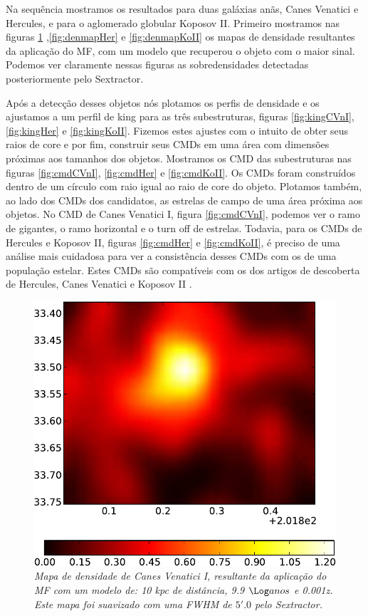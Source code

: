 \documentclass[
	12pt,				%
	openany,			%
	oneside,			%
	a4paper,			%
	english,			%
	brazil				%
	]{abntex2}
\begin{document}
Na sequência mostramos os resultados para duas galáxias anãs, Canes Venatici e Hercules, e para o aglomerado globular Koposov II. Primeiro mostramos nas figuras \ref{fig:denmapCVnI} ,\ref{fig:denmapHer} e \ref{fig:denmapKoII} os mapas de densidade resultantes da aplicação do MF, com um modelo que recuperou o objeto com o maior sinal. Podemos ver claramente nessas figuras as sobredensidades detectadas posteriormente pelo Sextractor. \par 
Após a detecção desses objetos nós plotamos os perfis de densidade e os ajustamos a um perfil de king \cite{1962AJ.....67..471K} para as três subestruturas, figuras \ref{fig:kingCVnI}, \ref{fig:kingHer} e \ref{fig:kingKoII}. Fizemos estes ajustes com o intuito de obter  seus raios de core e por fim, construir seus CMDs em uma área com dimensões próximas aos tamanhos dos objetos. Mostramos os CMD das subestruturas nas figuras \ref{fig:cmdCVnI}, \ref{fig:cmdHer} e \ref{fig:cmdKoII}. Os CMDs foram construídos dentro de um círculo com raio igual ao raio de core do objeto. Plotamos também, ao lado dos CMDs dos candidatos, as estrelas de campo de uma área próxima aos objetos. No CMD de Canes Venatici I, figura \ref{fig:cmdCVnI}, podemos ver o ramo de gigantes, o ramo horizontal e o turn off de estrelas. Todavia, para os CMDs de Hercules e Koposov II,  figuras \ref{fig:cmdHer} e \ref{fig:cmdKoII}, é preciso de uma análise mais cuidadosa para ver a consistência desses CMDs com os de uma população estelar. Estes CMDs são compatíveis com os dos artigos de descoberta de Hercules, Canes Venatici \cite{2007ApJ...654..897B} e  Koposov II \cite{2007ApJ...669..337K}.

\begin{figure}[H]
\begin{center}
\includegraphics[width=12cm]{figuras/mapa_densityCVnI.pdf}
\caption{\textit{Mapa de densidade de Canes Venatici I, resultante da aplicação do MF com um modelo de: 10 kpc de distância, 9.9 $\Log anos$ e 0.001z. Este mapa foi suavizado com uma FWHM de $5'.0$ pelo Sextractor.}}
\label{fig:denmapCVnI}
\end{center}
\end{figure}
\vspace{0.5cm}
\end{document}
